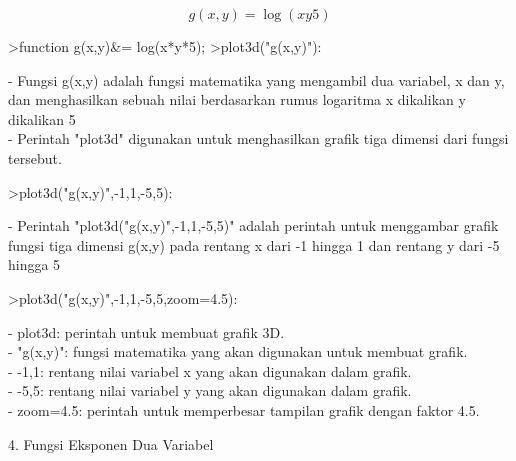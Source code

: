\documentclass[a4paper,10pt]{article}
\begin{document}
\begin{eulernotebook}
\begin{eulercomment}
\begin{eulercomment}
\begin{eulercomment}
\begin{eulercomment}
\begin{eulercomment}
\begin{eulercomment}
\begin{eulercomment}
\begin{eulercomment}
\begin{eulercomment}
\end{eulercomment}
\begin{eulerformula}
\[
g(x,y) = \log(xy5)
\]
\end{eulerformula}
\begin{eulerprompt}
>function g(x,y)&= log(x*y*5);
>plot3d("g(x,y)"):
\end{eulerprompt}
\begin{eulercomment}
- Fungsi g(x,y) adalah fungsi matematika yang mengambil dua variabel,
x dan y, dan menghasilkan sebuah nilai berdasarkan rumus logaritma x
dikalikan y dikalikan 5\\
- Perintah "plot3d" digunakan untuk menghasilkan grafik tiga dimensi
dari fungsi tersebut.
\end{eulercomment}
\begin{eulerprompt}
>plot3d("g(x,y)",-1,1,-5,5):
\end{eulerprompt}
\begin{eulercomment}
- Perintah "plot3d("g(x,y)",-1,1,-5,5)" adalah perintah untuk
menggambar grafik fungsi tiga dimensi g(x,y) pada rentang x dari -1
hingga 1 dan rentang y dari -5 hingga 5
\end{eulercomment}
\begin{eulerprompt}
>plot3d("g(x,y)",-1,1,-5,5,zoom=4.5):
\end{eulerprompt}
\begin{eulercomment}
- plot3d: perintah untuk membuat grafik 3D.\\
- "g(x,y)": fungsi matematika yang akan digunakan untuk membuat
grafik.\\
- -1,1: rentang nilai variabel x yang akan digunakan dalam grafik.\\
- -5,5: rentang nilai variabel y yang akan digunakan dalam grafik.\\
- zoom=4.5: perintah untuk memperbesar tampilan grafik dengan faktor
4.5.

\end{eulercomment}
\eulersubheading{}
\begin{eulercomment}
4. Fungsi Eksponen Dua Variabel


\end{eulercomment}
\end{eulercomment}
\end{eulercomment}
\end{eulercomment}
\end{eulercomment}
\end{eulercomment}
\end{eulercomment}
\end{eulercomment}
\end{eulercomment}
\end{eulernotebook}
\end{document}
